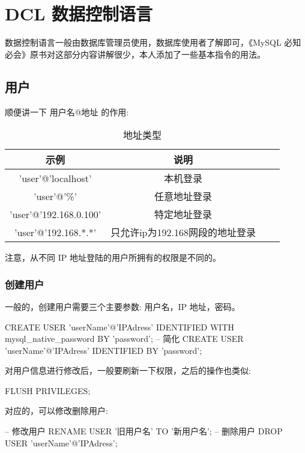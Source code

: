 \section{DCL 数据控制语言}

数据控制语言一般由数据库管理员使用，数据库使用者了解即可，《MySQL 必知必会》原书对这部分内容讲解很少，本人添加了一些基本指令的用法。

\subsection{用户}

顺便讲一下 用户名@地址 的作用:
\begin{table}[H]
    \small
    \centering
    \caption{地址类型}
    \label{table:地址类型}
    \setlength{\tabcolsep}{4mm}
    \begin{tabular}{c|ccc}
        \toprule
        \textbf{示例} & \textbf{说明} \\
        \midrule
        'user'@'localhost' & 本机登录 \\
        'user'@'\%' & 任意地址登录 \\
        'user'@'192.168.0.100' & 特定地址登录 \\
        'user'@'192.168.*.*' & 只允许ip为192.168网段的地址登录 \\
        \bottomrule
    \end{tabular}
\end{table}

注意，从不同 IP 地址登陆的用户所拥有的权限是不同的。

\subsubsection{创建用户}

一般的，创建用户需要三个主要参数: 用户名，IP 地址，密码。

\begin{sql}
CREATE USER 'userName'@'IPAdress' IDENTIFIED WITH mysql_native_password BY 'password';
-- 简化
CREATE USER 'userName'@'IPAdress' IDENTIFIED BY 'password';
\end{sql}

对用户信息进行修改后，一般要刷新一下权限，之后的操作也类似:

\begin{sql}
FLUSH PRIVILEGES;
\end{sql}

对应的，可以修改删除用户:

\begin{sql}
-- 修改用户
RENAME USER '旧用户名' TO '新用户名';
-- 删除用户
DROP USER 'userName'@'IPAdress';
\end{sql}

